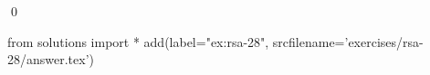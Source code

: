 
\begin{ex} 
  \label{ex:rsa-28}
  
  \qed
\end{ex} 
\begin{python0}
from solutions import *
add(label="ex:rsa-28",
    srcfilename='exercises/rsa-28/answer.tex') 
\end{python0}
